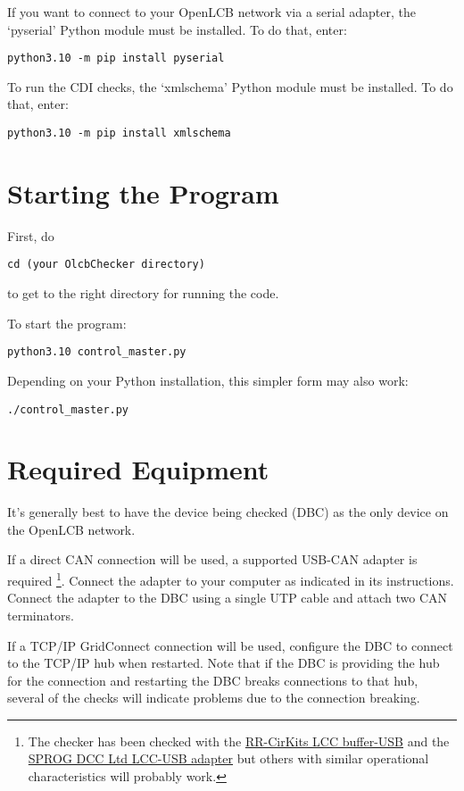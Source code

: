 If you want to connect to your OpenLCB network via a serial adapter, 
the `pyserial' Python module must be installed. To do that,
enter:
\begin{verbatim}
python3.10 -m pip install pyserial
\end{verbatim}

To run the CDI checks, the `xmlschema' Python module must be installed. To do that,
enter:
\begin{verbatim}
python3.10 -m pip install xmlschema
\end{verbatim}

\section{Starting the Program}

First, do
\begin{verbatim}
cd (your OlcbChecker directory)
\end{verbatim}
to get to the right directory for running the code.

To start the program:
\begin{verbatim}
python3.10 control_master.py
\end{verbatim}

Depending on your Python installation, this simpler form may also work:
\begin{verbatim}
./control_master.py
\end{verbatim}

\section{Required Equipment}

It's generally best to have the device being checked (DBC)
as the only device on the OpenLCB network.

If a direct CAN connection will be used,
a supported USB-CAN adapter is required
\footnote{The checker has been checked with the
\href{https://www.rr-cirkits.com/description/LCC-usb-flyer.pdf}{RR-CirKits LCC buffer-USB}
and the \href{https://www.sprog-dcc.co.uk/lcc-start-page}{SPROG DCC Ltd LCC-USB adapter}
but others with similar operational characteristics will probably work.
}.
Connect the adapter to your computer as indicated in its instructions.
Connect the adapter to the DBC using a single UTP cable
and attach two CAN terminators.

If a TCP/IP GridConnect connection will be used,
configure the DBC to connect to the TCP/IP hub when restarted. Note that if
the DBC is providing the hub for the connection and restarting the DBC
breaks connections to that hub, several of the checks will indicate problems
due to the connection breaking.

